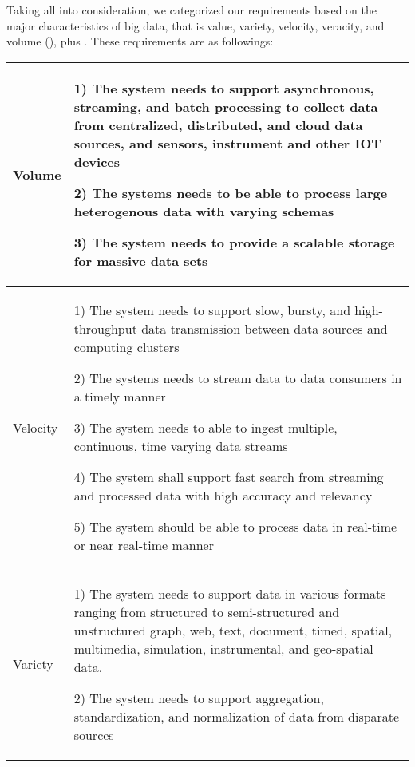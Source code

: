 \documentclass[conference]{IEEEtran}
\begin{document}
Taking all into consideration, we categorized our requirements based on the major characteristics of big data, that is value, variety, velocity, veracity, and volume (\cite{ataei}), plus  . These requirements are as followings: 

\newcommand\rownumber{\stepcounter{magicrownumbers}\arabic{magicrownumbers}}

\begin{center}
    \begin{table*}
    \renewcommand*{\arraystretch}{1.8}
    \begin{tabular}{ | m{1.5cm} | m{14.5cm} |}
        \hline
        Volume &
        1) The system needs to support asynchronous, streaming, and batch processing to collect data from centralized, distributed, and cloud data sources, and sensors, instrument and other IOT devices 

        2) The systems needs to be able to process large heterogenous data with varying schemas 
        
        3) The system needs to provide a scalable storage for massive data sets 
 
        \\ 
        \hline

        Velocity & 
        
        1) The system needs to support slow, bursty, and high-throughput data transmission between data sources and computing clusters
        
        2) The systems needs to stream data to data consumers in a timely manner 

        3) The system needs to able to ingest multiple, continuous, time varying data streams 

        4) The system shall support fast search from streaming and processed data with high accuracy and relevancy 
        
        5) The system should be able to process data in real-time or near real-time manner 
    
        \\ 

        \hline

        Variety & 
        1) The system needs to support data in various formats ranging from structured to semi-structured and unstructured graph, web, text, document, timed, spatial, multimedia, simulation, instrumental, and geo-spatial data. 

        2) The system needs to support aggregation, standardization, and normalization of data from disparate sources 


\end{tabular}
\end{table*}
\end{center}
\end{document}
